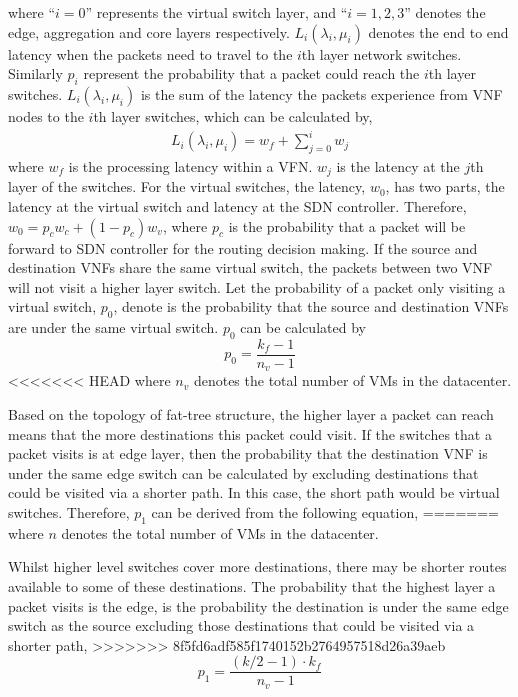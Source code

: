 \noindent where ``$i=0$'' represents the virtual switch layer, and ``$i=1,2,3$'' denotes the edge, aggregation and core layers respectively. ${ L }_{ i }({ \lambda  }_{ i },\mu _{ i })$ denotes the end to end latency when the packets need to travel to the $i$th layer network switches. Similarly $p_i$ represent the probability that a packet could reach the $i$th layer switches. ${ L }_{ i }({ \lambda  }_{ i },\mu _{ i })$ is the sum of the latency the packets experience from VNF nodes to the $i$th layer switches, which can be calculated by, 
\begin{equation}
\label{eq:latency:path}
\begin{split}
{ L }_{ i }({ \lambda  }_{ i },\mu _{ i })={ w }_{ f }+\sum _{ j=0 }^{ i }{ { w }_{ j } } 
\end{split}
\end{equation}
\noindent where $w_{f}$ is the processing latency within a VFN. $w_j$ is the latency at the $j$th layer of the switches. For the virtual switches, the latency, $w_0$, has two parts, the latency at the virtual switch and latency at the SDN controller. Therefore, $w_0=p_cw_c + (1-p_c)w_v$, where $p_c$ is the probability that a packet will be forward to SDN controller for the routing decision making. If the source and destination VNFs share the same virtual switch, the packets between two VNF will not visit a higher layer switch. Let the probability of a packet only visiting a virtual switch, $p_0$, denote is the probability that the source and destination VNFs are under the same virtual switch. $p_0$ can be calculated by 
\begin{equation}
\label{eq:p_vm}
p_{0} = \frac{k_{f} - 1}{n_v - 1}
\end{equation}
<<<<<<< HEAD
\noindent where $n_v$ denotes the total number of VMs in the datacenter.

Based on the topology of fat-tree structure, the higher layer a packet can reach means that the more destinations this packet could visit. If the switches that a packet visits is at edge layer, then the probability that the destination VNF is under the same edge switch can be calculated by excluding destinations that could be visited via a shorter path. In this case, the short path would be virtual switches. Therefore, $p_1$ can be derived from the following equation, 
=======
\noindent where $n$ denotes the total number of VMs in the datacenter.

Whilst higher level switches cover more destinations, there may be shorter routes available to some of these destinations. The probability that the highest layer a packet visits is the edge, is the probability the destination is under the same edge switch as the source excluding those destinations that could be visited via a shorter path,
>>>>>>> 8f5fd6adf585f1740152b2764957518d26a39aeb
\begin{equation}
\label{eq:p_edge}
p_{1} = \frac{(k/2-1) \cdot k_{f}}{n_v - 1}
\end{equation}

